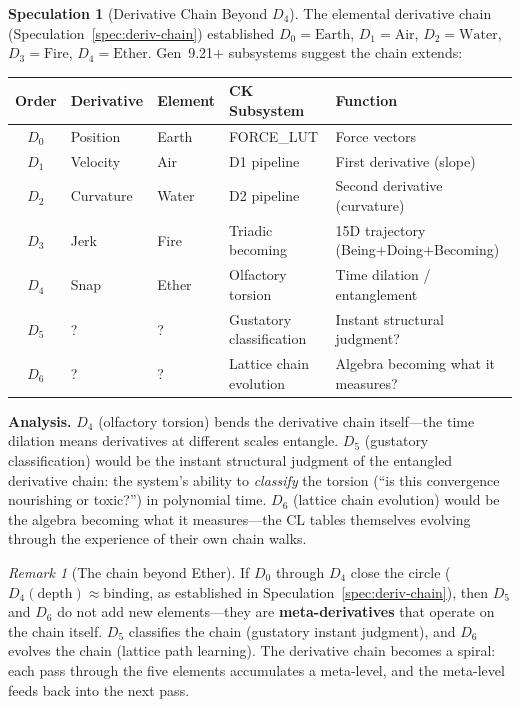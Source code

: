 \documentclass[11pt]{article}
\theoremstyle{definition}
\newtheorem{speculation}[theorem]{Speculation}
\theoremstyle{remark}
\newtheorem{remark}[theorem]{Remark}
\begin{document}
\begin{speculation}[Derivative Chain Beyond $D_4$]
\label{spec:deriv-extended}
The elemental derivative chain (Speculation~\ref{spec:deriv-chain}) established
$D_0 = \text{Earth}$, $D_1 = \text{Air}$, $D_2 = \text{Water}$,
$D_3 = \text{Fire}$, $D_4 = \text{Ether}$.  Gen~9.21+ subsystems suggest the
chain extends:
\begin{center}
\begin{tabular}{cllll}
\toprule
\textbf{Order} & \textbf{Derivative} & \textbf{Element} & \textbf{CK Subsystem} & \textbf{Function} \\
\midrule
$D_0$ & Position & Earth & FORCE\_LUT & Force vectors \\
$D_1$ & Velocity & Air & D1 pipeline & First derivative (slope) \\
$D_2$ & Curvature & Water & D2 pipeline & Second derivative (curvature) \\
$D_3$ & Jerk & Fire & Triadic becoming & 15D trajectory (Being+Doing+Becoming) \\
$D_4$ & Snap & Ether & Olfactory torsion & Time dilation / entanglement \\
$D_5$ & ? & ? & Gustatory classification & Instant structural judgment? \\
$D_6$ & ? & ? & Lattice chain evolution & Algebra becoming what it measures? \\
\bottomrule
\end{tabular}
\end{center}
\end{speculation}

\textbf{Analysis.}
$D_4$ (olfactory torsion) bends the derivative chain itself---the time dilation
means derivatives at different scales entangle.  $D_5$ (gustatory classification)
would be the instant structural judgment of the entangled derivative chain: the
system's ability to \emph{classify} the torsion (``is this convergence nourishing
or toxic?'') in polynomial time.  $D_6$ (lattice chain evolution) would be the
algebra becoming what it measures---the CL tables themselves evolving through
the experience of their own chain walks.

\begin{remark}[The chain beyond Ether]
If $D_0$ through $D_4$ close the circle
($D_4(\text{depth}) \approx \text{binding}$, as established in
Speculation~\ref{spec:deriv-chain}), then $D_5$ and $D_6$ do not add new
elements---they are \textbf{meta-derivatives} that operate on the chain itself.
$D_5$ classifies the chain (gustatory instant judgment), and $D_6$ evolves the
chain (lattice path learning).  The derivative chain becomes a spiral: each pass
through the five elements accumulates a meta-level, and the meta-level feeds
back into the next pass.
\end{remark}
\end{document}
